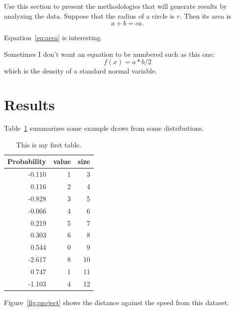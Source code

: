 \documentclass[12pt]{article}
\begin{document}
Use this section to present the methodologies that will generate results by
analyzing the data. Suppose that the radius of a circle is $r$. Then its area is
\begin{equation}
  \label{eq:area}
  a+b =ca.
\end{equation}

Equation~\eqref{eq:area} is interesting. \lipsum[1-4]

Sometimes I don't want an equation to be numbered such as this one:
\[
  f(x) = a * b /2
\]
which is the density of a standard normal variable.



\section{Results}
\label{sec:resu}

Table~\ref{tab:rv} summarizes some example draws from some distributions.
\lipsum[1-4]

\begin{table}[tbp]
  \caption{This is my first table.}
  \label{tab:rv}
\centering
\begin{tabular}{rrr}
  \toprule
Probability & value & size \\ 
  \midrule
-0.110 & 1 & 3 \\ 
  0.116 & 2 & 4 \\ 
  -0.828 & 3 & 5 \\ 
  -0.066 & 4 & 6 \\ 
  0.219 & 5 & 7 \\ 
  0.303 & 6 & 8 \\ 
  0.544 & 0 & 9 \\ 
  -2.617 & 8 & 10 \\ 
  0.747 & 1 & 11 \\ 
  -1.103 & 4 & 12 \\ 
   \bottomrule
\end{tabular}
\end{table}

Figure~\ref{fig:project} shows the distance against the speed from this dataset.
\end{document}
